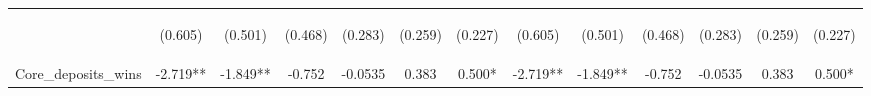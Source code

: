 \documentclass[]{article}
\begin{document}
\begin{center}
\begin{tabular}{lcccccccccccc}
\vspace{4pt} & \begin{footnotesize}(0.605)\end{footnotesize} & \begin{footnotesize}(0.501)\end{footnotesize} & \begin{footnotesize}(0.468)\end{footnotesize} & \begin{footnotesize}(0.283)\end{footnotesize} & \begin{footnotesize}(0.259)\end{footnotesize} & \begin{footnotesize}(0.227)\end{footnotesize} & \begin{footnotesize}(0.605)\end{footnotesize} & \begin{footnotesize}(0.501)\end{footnotesize} & \begin{footnotesize}(0.468)\end{footnotesize} & \begin{footnotesize}(0.283)\end{footnotesize} & \begin{footnotesize}(0.259)\end{footnotesize} & \begin{footnotesize}(0.227)\end{footnotesize} \\
Core\_deposits\_wins & -2.719** & -1.849** & -0.752 & -0.0535 & 0.383 & 0.500* & -2.719** & -1.849** & -0.752 & -0.0535 & 0.383 & 0.500* \\

\end{tabular}
\end{center}
\end{document}
